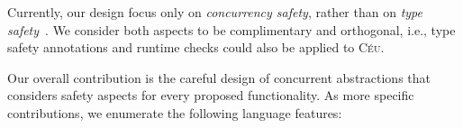 \documentclass[10pt]{sensys-proc}
\newcommand{\CEU}{\textsc{C\'{e}u}\xspace}
\begin{document}
Currently, our design focus only on \emph{concurrency safety}, rather than on 
\emph{type safety}~\cite{wsn.safety}.
We consider both aspects to be complimentary and orthogonal, i.e., type safety 
annotations and runtime checks could also be applied to \CEU.

\begin{comment}
TODO
\CEU is based on Esterel~\cite{esterel.ieee91} and follows a synchronous 
execution model~\cite{rp.twelve}, which enforces a disciplined step-by-step 
execution.
\CEU relies on a compile-time analysis to detect unbounded loops and concurrent 
access to variables.
\end{comment}

Our overall contribution is the careful design of concurrent abstractions that 
considers safety aspects for every proposed functionality.
As more specific contributions, we enumerate the following language features:
\end{document}
